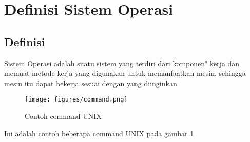 \section{Definisi Sistem Operasi}
		\subsection{Definisi}
		\hspace*{1cm} Sistem Operasi adalah suatu sistem yang terdiri dari komponen" kerja dan memuat metode kerja yang digunakan untuk memanfaatkan mesin, sehingga mesin itu dapat bekerja sesuai dengan yang diinginkan
		\begin{figure}[ht]
			\centerline{\texttt{[image: figures/command.png]}}
			\caption{Contoh command UNIX}
			\label{command}
			\end{figure}
		\vspace{1cm}Ini adalah contoh beberapa command UNIX pada gambar \ref{command} 